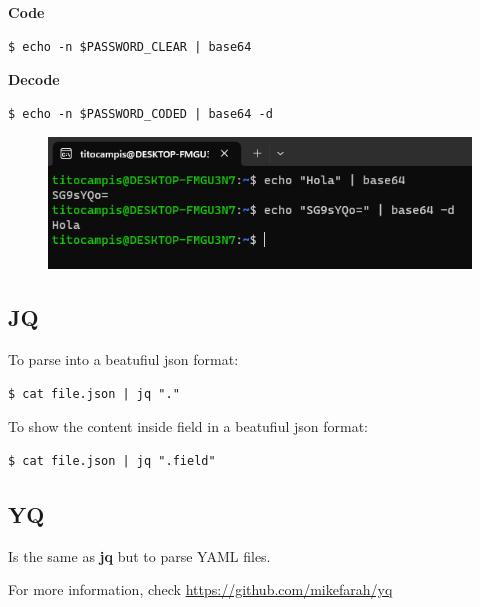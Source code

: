 \documentclass{article}
\newenvironment{codetemplate}[1][]{%
  \mybasecolorbox[#1]
  \itshape
}{%
  \endmybasecolorbox
}
\begin{document}
\textbf{Code}
\begin{codetemplate}{}
\begin{verbatim}
$ echo -n $PASSWORD_CLEAR | base64
\end{verbatim}
\end{codetemplate}

\textbf{Decode}
\begin{codetemplate}{}
\begin{verbatim}
$ echo -n $PASSWORD_CODED | base64 -d
\end{verbatim}
\end{codetemplate}

\begin{figure}[H]
    \centering
    \includegraphics[width=\textwidth]{pictures/base64.png}
\end{figure}


\subsection{JQ}

To parse into a beatufiul json format:
\begin{codetemplate}{}
\begin{verbatim}
$ cat file.json | jq "."
\end{verbatim}
\end{codetemplate}

To show the content inside field in a beatufiul json format:
\begin{codetemplate}{}
\begin{verbatim}
$ cat file.json | jq ".field"
\end{verbatim}
\end{codetemplate}

\subsection{YQ}

Is the same as \textbf{jq} but to parse YAML files.

For more information, check \url{https://github.com/mikefarah/yq}
\end{document}
